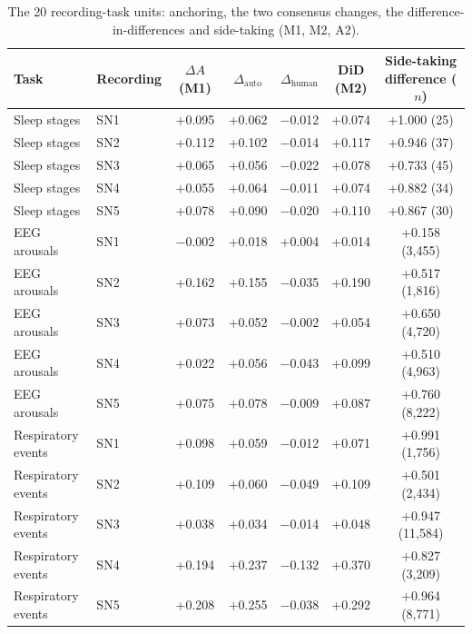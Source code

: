 \begin{table}[h!]
\centering
\footnotesize
\caption{The 20 recording-task units: anchoring, the two consensus changes, the difference-in-differences and side-taking (M1, M2, A2).}
\label{tab:s-units}
\begin{adjustbox}{max width=\linewidth}
\begin{tabular}{llccccc}
\toprule
Task & Recording & \makecell{$\Delta A$\\(M1)} & $\Delta_{\mathrm{auto}}$ & $\Delta_{\mathrm{human}}$ & \makecell{DiD\\(M2)} & \makecell{Side-taking\\difference ($n$)} \\
\midrule
Sleep stages & SN1 & +0.095 & +0.062 & \ensuremath{-}0.012 & +0.074 & +1.000 (25) \\
Sleep stages & SN2 & +0.112 & +0.102 & \ensuremath{-}0.014 & +0.117 & +0.946 (37) \\
Sleep stages & SN3 & +0.065 & +0.056 & \ensuremath{-}0.022 & +0.078 & +0.733 (45) \\
Sleep stages & SN4 & +0.055 & +0.064 & \ensuremath{-}0.011 & +0.074 & +0.882 (34) \\
Sleep stages & SN5 & +0.078 & +0.090 & \ensuremath{-}0.020 & +0.110 & +0.867 (30) \\
EEG arousals & SN1 & \ensuremath{-}0.002 & +0.018 & +0.004 & +0.014 & +0.158 (3{,}455) \\
EEG arousals & SN2 & +0.162 & +0.155 & \ensuremath{-}0.035 & +0.190 & +0.517 (1{,}816) \\
EEG arousals & SN3 & +0.073 & +0.052 & \ensuremath{-}0.002 & +0.054 & +0.650 (4{,}720) \\
EEG arousals & SN4 & +0.022 & +0.056 & \ensuremath{-}0.043 & +0.099 & +0.510 (4{,}963) \\
EEG arousals & SN5 & +0.075 & +0.078 & \ensuremath{-}0.009 & +0.087 & +0.760 (8{,}222) \\
Respiratory events & SN1 & +0.098 & +0.059 & \ensuremath{-}0.012 & +0.071 & +0.991 (1{,}756) \\
Respiratory events & SN2 & +0.109 & +0.060 & \ensuremath{-}0.049 & +0.109 & +0.501 (2{,}434) \\
Respiratory events & SN3 & +0.038 & +0.034 & \ensuremath{-}0.014 & +0.048 & +0.947 (11{,}584) \\
Respiratory events & SN4 & +0.194 & +0.237 & \ensuremath{-}0.132 & +0.370 & +0.827 (3{,}209) \\
Respiratory events & SN5 & +0.208 & +0.255 & \ensuremath{-}0.038 & +0.292 & +0.964 (8{,}771) \\

\end{tabular}
\end{adjustbox}
\end{table}
